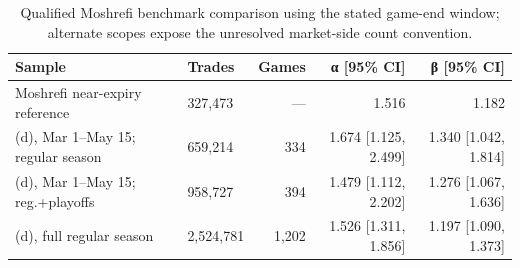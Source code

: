 \begin{table}[!htbp]
\centering
\small
\caption{Qualified Moshrefi benchmark comparison using the stated game-end window; alternate scopes expose the unresolved market-side count convention.}
\label{tab:replication-5a-d}
\begin{tabular}{llrrr}
\toprule
Sample & Trades & Games & α [95\% CI] & β [95\% CI] \\
\midrule
Moshrefi near-expiry reference & 327,473 & — & 1.516 & 1.182 \\
(d), Mar 1–May 15; regular season & 659,214 & 334 & 1.674 [1.125, 2.499] & 1.340 [1.042, 1.814] \\
(d), Mar 1–May 15; reg.+playoffs & 958,727 & 394 & 1.479 [1.112, 2.202] & 1.276 [1.067, 1.636] \\
(d), full regular season & 2,524,781 & 1,202 & 1.526 [1.311, 1.856] & 1.197 [1.090, 1.373] \\
\bottomrule
\end{tabular}
\end{table}
